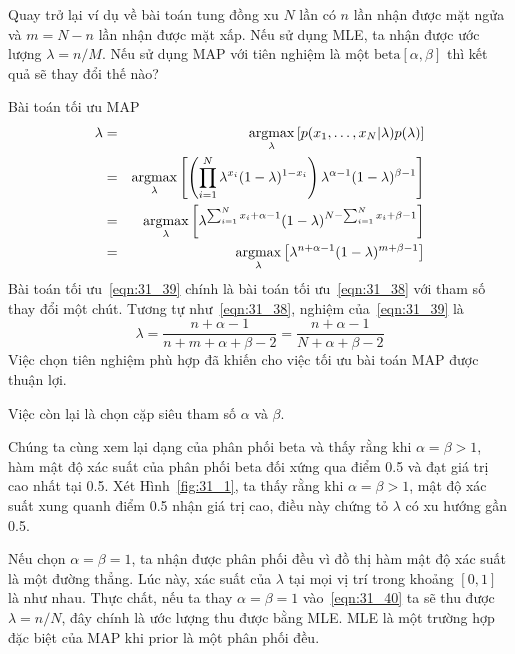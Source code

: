 Quay trở lại ví dụ về bài toán tung đồng xu $N$ lần có $n$ lần nhận được mặt
ngửa và $m = N - n$ lần nhận được mặt xấp. Nếu sử dụng MLE,
ta nhận được ước lượng $\lambda = n/M$. Nếu sử dụng MAP với tiên nghiệm là một
$\text{beta}[\alpha, \beta]$ thì kết quả sẽ thay đổi thế nào?

Bài toán tối ưu MAP
\begin{eqnarray}
\nonumber
\lambda & = & \operatorname*{argmax}_{\lambda} \left[p(x_1, \dots, x_N | \lambda) p(\lambda) \right] \\\
\nonumber
& = & \operatorname*{argmax}_{\lambda} \left[\left(\prod_{i=1}^N \lambda^{x_i} ( 1- \lambda)^{1 - x_i}\right) \lambda^{\alpha - 1} ( 1 - \lambda)^{\beta - 1} \right] \\\
\nonumber
& = & \operatorname*{argmax}_{\lambda} \left[ \lambda^{\sum_{i = 1}^N x_i + \alpha - 1} ( 1- \lambda)^{N - \sum_{i=1}^N x_i + \beta - 1} \right] \\\
\label{eqn:31_39}
& = & \operatorname*{argmax}_{\lambda} \left[ \lambda^{n + \alpha - 1} ( 1- \lambda)^{m + \beta - 1} \right]
\end{eqnarray}
Bài toán tối ưu~\eqref{eqn:31_39} chính là bài toán tối ưu~\eqref{eqn:31_38} với
tham số thay đổi một chút. Tương tự như~\eqref{eqn:31_38}, nghiệm
của~\eqref{eqn:31_39} là
\begin{equation}
\label{eqn:31_40}
\lambda = \frac{n + \alpha - 1}{n + m + \alpha + \beta - 2}= \frac{n + \alpha - 1}{N + \alpha + \beta - 2}
\end{equation}
Việc chọn tiên nghiệm phù hợp đã khiến cho việc tối ưu bài toán MAP được thuận
lợi.


Việc còn lại là chọn cặp siêu tham số $\alpha$ và $\beta$.

Chúng ta cùng xem lại dạng của phân phối beta và thấy rằng khi $\alpha
= \beta > 1$, hàm mật độ xác suất của phân phối beta đối xứng qua điểm 0.5 và
đạt giá trị cao nhất tại 0.5. Xét Hình~\ref{fig:31_1}, ta thấy rằng khi
$\alpha =\beta > 1$, mật độ xác suất xung quanh điểm 0.5 nhận giá trị
cao, điều này chứng tỏ $\lambda$ có xu hướng gần 0.5.

Nếu chọn $\alpha = \beta = 1$, ta nhận được phân phối đều vì đồ thị hàm mật
độ xác suất là một đường thẳng. Lúc này, xác suất của $\lambda$ tại mọi vị trí
trong khoảng $[0, 1]$ là như nhau. Thực chất, nếu ta thay $\alpha = \beta = 1$
vào~\eqref{eqn:31_40} ta sẽ thu được $\lambda = n/N$, đây chính là ước lượng thu
được bằng MLE. MLE là một trường hợp đặc biệt của MAP khi prior là một phân phối
đều.

